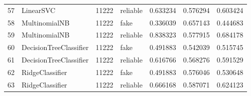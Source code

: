 \begin{longtable}{llllrrr}
57 &               LinearSVC &        11222 &  reliable &  0.633234 &   0.576294 &  0.603424 \\
58 &           MultinomialNB &        11222 &      fake &  0.336039 &   0.657143 &  0.444683 \\
59 &           MultinomialNB &        11222 &  reliable &  0.838323 &   0.577915 &  0.684178 \\
60 &  DecisionTreeClassifier &        11222 &      fake &  0.491883 &   0.542039 &  0.515745 \\
61 &  DecisionTreeClassifier &        11222 &  reliable &  0.616766 &   0.568276 &  0.591529 \\
62 &         RidgeClassifier &        11222 &      fake &  0.491883 &   0.576046 &  0.530648 \\
63 &         RidgeClassifier &        11222 &  reliable &  0.666168 &   0.587071 &  0.624123 \\
\bottomrule
\end{longtable}
\newpage
